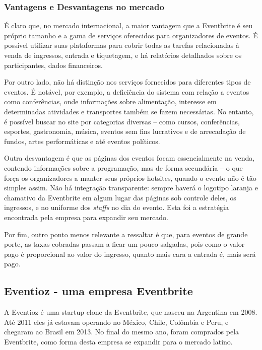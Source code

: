 \documentclass[12pt,a4paper,twoside,hyphens,english,brazil]{abntex2}
\begin{document}
\subsubsection*{Vantagens e Desvantagens no mercado}
É claro que, no mercado internacional, a maior vantagem que a Eventbrite é seu próprio tamanho e a gama de serviços oferecidos para organizadores de eventos. É possível utilizar suas plataformas para cobrir todas as tarefas relacionadas à venda de ingressos, entrada e tiquetagem, e há relatórios detalhados sobre os participantes, dados financeiros.

Por outro lado, não há distinção nos serviços fornecidos para diferentes tipos de eventos. É notável, por exemplo, a deficiência do sistema com relação a eventos como conferências, onde informações sobre alimentação, interesse em determinadas atividades e transportes também se fazem necessárias\cite{eventbrite-review}. No entanto, é possível buscar no site por categorias diversas -- como cursos, conferências, esportes, gastronomia, música, eventos sem fins lucrativos e de arrecadação de fundos, artes performáticas e até eventos políticos.

Outra desvantagem é que as páginas dos eventos focam essencialmente na venda, contendo informações sobre a programação, mas de forma secundária -- o que força os organizadores a manter seus próprios hotsites, quando o evento não é tão simples assim. Não há integração transparente: sempre haverá o logotipo laranja e chamativo da Eventbrite em algum lugar das páginas sob controle deles, os ingressos, e no uniforme dos \emph{staffs} no dia do evento. Esta foi a estratégia encontrada pela empresa para expandir seu mercado.

Por fim, outro ponto menos relevante a ressaltar é que, para eventos de grande porte, as taxas cobradas passam a ficar um pouco salgadas, pois como o valor pago é proporcional ao valor do ingresso, quanto mais cara a entrada é, mais será pago.


\subsection{Eventioz - uma empresa Eventbrite}
A Eventioz é uma startup clone da Eventbrite, que nasceu na Argentina em 2008. Até 2011 eles já estavam operando no México, Chile, Colômbia e Peru, e chegaram ao Brasil em 2013. No final do mesmo ano, foram comprados pela Eventbrite, como forma desta empresa se expandir para o mercado latino.
\end{document}
